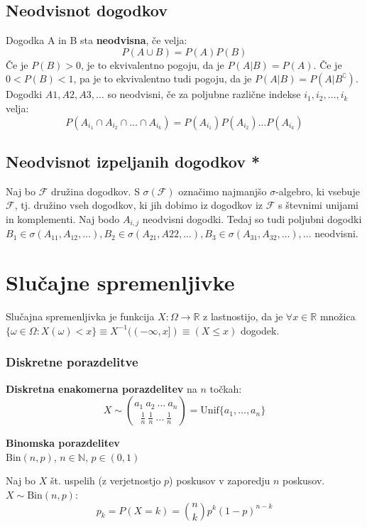 \begin{multicols}{4}
\subsection{Neodvisnot dogodkov}

Dogodka A in B sta \textbf{neodvisna}, če velja:
\[ P(A \cup B) = P(A) P(B) \]
Če je $P(B) > 0$, je to ekvivalentno pogoju, da je $P(A | B) = P(A)$.
Če je $0 < P(B) < 1$, pa je to ekvivalentno tudi pogoju, da je $P(A | B) = P(A | B^\complement)$.
Dogodki $A1, A2, A3, \dots$ so neodvisni, če za poljubne različne indekse $i_1, i_2, \dots , i_k$ velja:
\[ P(A_{i_1} \cap A_{i_2} \cap \dots \cap A_{i_k}) = P(A_{i_1}) P(A_{i_2}) \dots P(A_{i_k}) \]

\subsection{Neodvisnot izpeljanih dogodkov *}
Naj bo $\mathcal{F}$ družina dogodkov. S $\sigma(\mathcal{F})$ označimo najmanjšo $\sigma$-algebro, ki vsebuje
$\mathcal{F}$, tj. družino vseh dogodkov, ki jih dobimo iz dogodkov iz $\mathcal{F}$ s števnimi unijami
in komplementi.
Naj bodo $A_{i,j}$ neodvisni dogodki. Tedaj so tudi poljubni dogodki $B_1 \in \sigma(A_{11}, A_{12}, \dots), B_2 \in \sigma(A_21, A22, . . .), B_3 \in \sigma(A_{31}, A_{32}, \dots), \dots$ neodvisni.

\section{Slučajne spremenljivke}
Slučajna spremenljivka je funkcija $X: \Omega \to \mathbb{R}$ z lastnostijo, da je $\forall x \in \mathbb{R}$ množica $\{ \omega \in \Omega : X(\omega) < x \} \equiv X^{-1}((-\infty, x]) \equiv (X \leq x)$ dogodek.

\subsubsection{Diskretne porazdelitve}
\textbf{Diskretna enakomerna porazdelitev} na $n$ točkah:
\[ X \sim \binom{a_1\ a_2\ \dots\ a_n}{\frac{1}{n}\ \frac{1}{n}\ \dots\ \frac{1}{n}} = \text{Unif} \{ a_1 , \dots , a_n \} \]

\textbf{Binomska porazdelitev} \\
$\text{Bin}(n, p)$, $n \in \mathbb{N}$, $p \in (0,1)$

Naj bo $X$ št. uspelih (z verjetnostjo $p$) poskusov v zaporedju $n$ poskusov. $X \sim \text{Bin}(n, p)$:
\[ p_k = P(X = k) = \binom{n}{k} p^k (1-p)^{n-k}\]


\end{multicols}
